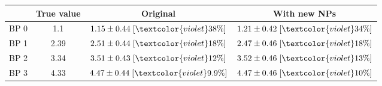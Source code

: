 \begin{tabular}{c||c|c|c}
 & True value & Original & With new NPs\\
\hline\hline
BP 0 & 1.1 & $1.15\pm0.44\;[\textcolor{violet}{38\%}]$ & $1.21\pm0.42\;[\textcolor{violet}{34\%}]$\\\hline
BP 1 & 2.39 & $2.51\pm0.44\;[\textcolor{violet}{18\%}]$ & $2.47\pm0.46\;[\textcolor{violet}{18\%}]$\\\hline
BP 2 & 3.34 & $3.51\pm0.43\;[\textcolor{violet}{12\%}]$ & $3.52\pm0.46\;[\textcolor{violet}{13\%}]$\\\hline
BP 3 & 4.33 & $4.47\pm0.44\;[\textcolor{violet}{9.9\%}]$ & $4.47\pm0.46\;[\textcolor{violet}{10\%}]$\\
\end{tabular}
